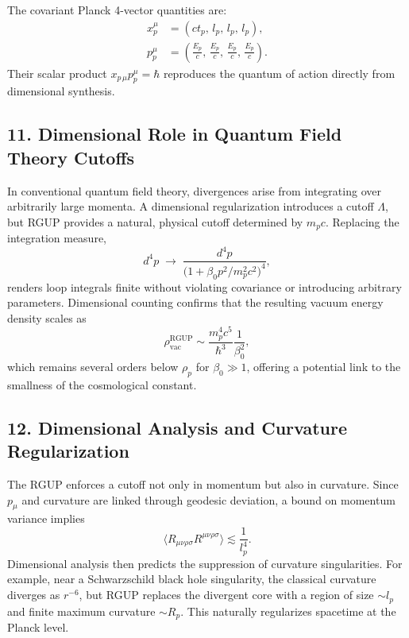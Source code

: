 \documentclass[11pt,oneside]{book}
\numberwithin{equation}{chapter}
\newcommand{\betaz}{\beta_0}
\begin{document}
The covariant Planck 4-vector quantities are:
\begin{align*}
x_p^\mu &= (ct_p,\, l_p,\, l_p,\, l_p),\\[2pt]
p_p^\mu &= \left(\frac{E_p}{c},\,\frac{E_p}{c},\,\frac{E_p}{c},\,\frac{E_p}{c}\right).
\end{align*}
Their scalar product $x_{p\,\mu} p_p^\mu = \hbar$ reproduces the quantum of action directly from dimensional synthesis.

\subsection*{11. Dimensional Role in Quantum Field Theory Cutoffs}

In conventional quantum field theory, divergences arise from integrating over arbitrarily large momenta.  
A dimensional regularization introduces a cutoff $\Lambda$, but RGUP provides a natural, physical cutoff determined by $m_p c$.  
Replacing the integration measure,
\begin{equation}
d^4p \;\rightarrow\; \frac{d^4p}{\big(1+\betaz p^2/m_p^2 c^2\big)^4},
\end{equation}
renders loop integrals finite without violating covariance or introducing arbitrary parameters.  
Dimensional counting confirms that the resulting vacuum energy density scales as
\begin{equation}
\rho_{\text{vac}}^{\text{RGUP}} \sim \frac{m_p^4 c^5}{\hbar^3} \frac{1}{\betaz^2},
\end{equation}
which remains several orders below $\rho_p$ for $\betaz \gg 1$, offering a potential link to the smallness of the cosmological constant.

\subsection*{12. Dimensional Analysis and Curvature Regularization}

The RGUP enforces a cutoff not only in momentum but also in curvature.  
Since $p_\mu$ and curvature are linked through geodesic deviation, a bound on momentum variance implies
\begin{equation}
\langle R_{\mu\nu\rho\sigma}R^{\mu\nu\rho\sigma}\rangle
\lesssim
\frac{1}{l_p^4}.
\end{equation}
Dimensional analysis then predicts the suppression of curvature singularities.  
For example, near a Schwarzschild black hole singularity, the classical curvature diverges as $r^{-6}$, but RGUP replaces the divergent core with a region of size $\sim l_p$ and finite maximum curvature $\sim R_p$.  
This naturally regularizes spacetime at the Planck level.
\end{document}
